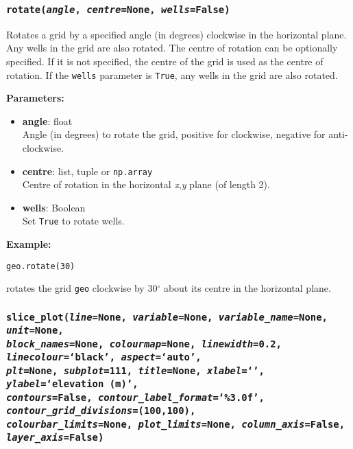\subsubsection{\texttt{rotate(\emph{angle}, \emph{centre}=\texttt{None}, \emph{wells}=\texttt{False})}}

Rotates a grid by a specified angle (in degrees) clockwise in the horizontal plane.  Any wells in the grid are also rotated.  The centre of rotation can be optionally specified.  If it is not specified, the centre of the grid is used as the centre of rotation.  If the \texttt{wells} parameter is \texttt{True}, any wells in the grid are also rotated.

\textbf{Parameters:}
\begin{itemize}
  \item \textbf{angle}: float\\
    Angle (in degrees) to rotate the grid, positive for clockwise, negative for anti-clockwise.
  \item \textbf{centre}: list, tuple or \texttt{np.array}\\
    Centre of rotation in the horizontal \emph{x},\emph{y} plane (of length 2).
  \item \textbf{wells}: Boolean\\
    Set \texttt{True} to rotate wells.
\end{itemize}

\textbf{Example:}

\begin{verbatim}
geo.rotate(30)
\end{verbatim}

rotates the grid \texttt{geo} clockwise by 30$^{\circ}$ about its centre in the horizontal plane.

\subsubsection{\texttt{slice\_plot(\emph{line}=None, \emph{variable}=None, \emph{variable\_name}=None, \emph{unit}=None,\\
    \emph{block\_names}=None, \emph{colourmap}=None, \emph{linewidth}=0.2, \emph{linecolour}=`black', \emph{aspect}=`auto',\\
    \emph{plt}=None, \emph{subplot}=111, \emph{title}=None, \emph{xlabel}=`', \emph{ylabel}=`elevation (m)',\\
    \emph{contours}=False, \emph{contour\_label\_format}=`\%3.0f', \emph{contour\_grid\_divisions}=(100,100),\\
    \emph{colourbar\_limits}=None, \emph{plot\_limits}=None, \emph{column\_axis}=False, \emph{layer\_axis}=False)}}

